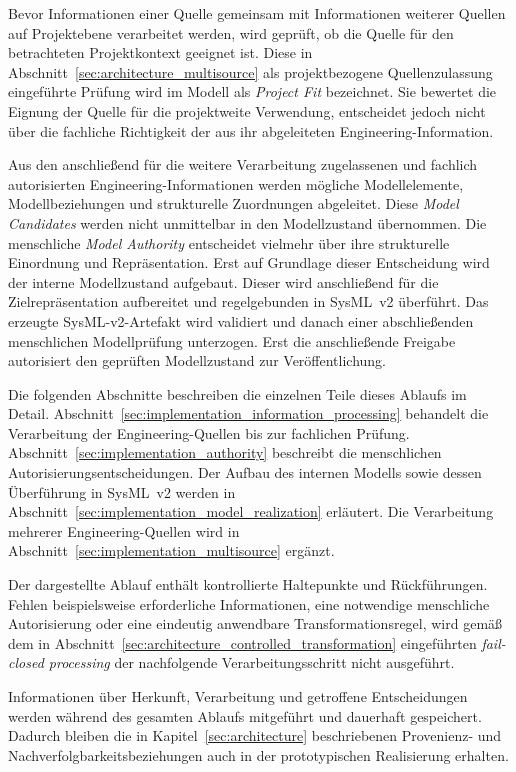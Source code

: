 Bevor Informationen einer Quelle gemeinsam mit Informationen weiterer
Quellen auf Projektebene verarbeitet werden, wird geprüft, ob die Quelle für
den betrachteten Projektkontext geeignet ist. Diese in
Abschnitt~\ref{sec:architecture_multisource} als projektbezogene
Quellenzulassung eingeführte Prüfung wird im Modell als
\emph{Project Fit} bezeichnet. Sie bewertet die Eignung der Quelle für die
projektweite Verwendung, entscheidet jedoch nicht über die fachliche
Richtigkeit der aus ihr abgeleiteten Engineering-Information.

Aus den anschließend für die weitere Verarbeitung zugelassenen und fachlich
autorisierten Engineering-Informationen werden mögliche Modellelemente,
Modellbeziehungen und strukturelle Zuordnungen abgeleitet. Diese
\emph{Model Candidates} werden nicht unmittelbar in den Modellzustand
übernommen. Die menschliche \emph{Model Authority} entscheidet vielmehr über
ihre strukturelle Einordnung und Repräsentation. Erst auf Grundlage dieser
Entscheidung wird der interne Modellzustand aufgebaut. Dieser wird
anschließend für die Zielrepräsentation aufbereitet und regelgebunden in
SysML~v2 überführt. Das erzeugte SysML-v2-Artefakt wird validiert und danach
einer abschließenden menschlichen Modellprüfung unterzogen. Erst die
anschließende Freigabe autorisiert den geprüften Modellzustand zur
Veröffentlichung.

Die folgenden Abschnitte beschreiben die einzelnen Teile dieses Ablaufs im
Detail. Abschnitt~\ref{sec:implementation_information_processing} behandelt
die Verarbeitung der Engineering-Quellen bis zur fachlichen Prüfung.
Abschnitt~\ref{sec:implementation_authority} beschreibt die menschlichen
Autorisierungsentscheidungen. Der Aufbau des internen Modells sowie dessen
Überführung in SysML~v2 werden in
Abschnitt~\ref{sec:implementation_model_realization} erläutert. Die
Verarbeitung mehrerer Engineering-Quellen wird in
Abschnitt~\ref{sec:implementation_multisource} ergänzt.

Der dargestellte Ablauf enthält kontrollierte Haltepunkte und
Rückführungen. Fehlen beispielsweise erforderliche Informationen, eine
notwendige menschliche Autorisierung oder eine eindeutig anwendbare
Transformationsregel, wird gemäß dem in
Abschnitt~\ref{sec:architecture_controlled_transformation} eingeführten
\emph{fail-closed processing} der nachfolgende Verarbeitungsschritt nicht
ausgeführt.

Informationen über Herkunft, Verarbeitung und getroffene Entscheidungen
werden während des gesamten Ablaufs mitgeführt und dauerhaft gespeichert.
Dadurch bleiben die in Kapitel~\ref{sec:architecture} beschriebenen
Provenienz- und Nachverfolgbarkeitsbeziehungen auch in der prototypischen
Realisierung erhalten.

